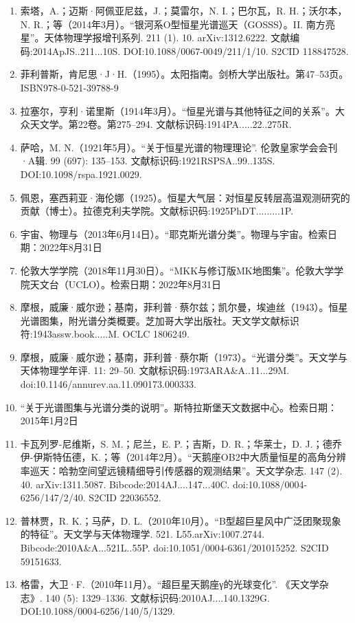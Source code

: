 \begin{enumerate}
\item 索塔，A.；迈斯·阿佩亚尼兹，J.；莫雷尔，N. I.；巴尔瓦，R. H.；沃尔本，N. R.；等（2014年3月）。“银河系O型恒星光谱巡天（GOSSS）。II. 南方亮星”。天体物理学报增刊系列. 211 (1). 10. arXiv:1312.6222. 文献编码:2014ApJS..211...10S. DOI:10.1088/0067-0049/211/1/10. S2CID 118847528.
\item 菲利普斯，肯尼思·J·H.（1995）。太阳指南。剑桥大学出版社。第47–53页。ISBN978-0-521-39788-9
\item 拉塞尔，亨利·诺里斯（1914年3月）。“恒星光谱与其他特征之间的关系”。大众天文学。第22卷。第275–294. 文献标识码:1914PA.....22..275R.
\item 萨哈，M. N.（1921年5月）。“关于恒星光谱的物理理论”. 伦敦皇家学会会刊·A辑. 99 (697): 135–153. 文献标识码:1921RSPSA..99..135S. DOI:10.1098/rspa.1921.0029.
\item 佩恩，塞西莉亚·海伦娜（1925）。恒星大气层：对恒星反转层高温观测研究的贡献（博士）。拉德克利夫学院。文献标识码:1925PhDT.........1P.
\item 宇宙、物理与（2013年6月14日）。“耶克斯光谱分类”。物理与宇宙。检索日期：2022年8月31日
\item 伦敦大学学院（2018年11月30日）。“MKK与修订版MK地图集”。伦敦大学学院天文台（UCLO）。检索日期：2022年8月31日
\item 摩根，威廉·威尔逊；基南，菲利普·蔡尔兹；凯尔曼，埃迪丝（1943）。恒星光谱图集，附光谱分类概要。芝加哥大学出版社。天文学文献标识符:1943assw.book.....M. OCLC 1806249.
\item 摩根，威廉·威尔逊；基南，菲利普·蔡尔斯（1973）。“光谱分类”。天文学与天体物理学年评. 11: 29–50. 文献标识码:1973ARA&A..11...29M. doi:10.1146/annurev.aa.11.090173.000333.
\item “关于光谱图集与光谱分类的说明”。斯特拉斯堡天文数据中心。检索日期：2015年1月2日
\item 卡瓦列罗-尼维斯，S. M.；尼兰，E. P.；吉斯，D. R.；华莱士，D. J.；德乔伊-伊斯特伍德，K.；等（2014年2月）。“天鹅座OB2中大质量恒星的高角分辨率巡天：哈勃空间望远镜精细导引传感器的观测结果”。天文学杂志. 147 (2). 40. arXiv:1311.5087. Bibcode:2014AJ....147...40C. doi:10.1088/0004-6256/147/2/40. S2CID 22036552.
\item 普林贾，R. K.；马萨，D. L.（2010年10月）。“B型超巨星风中广泛团聚现象的特征”。天文学与天体物理学. 521. L55.arXiv:1007.2744. Bibcode:2010A&A...521L..55P. doi:10.1051/0004-6361/201015252. S2CID 59151633.
\item 格雷，大卫·F.（2010年11月）。“超巨星天鹅座γ的光球变化”. 《天文学杂志》. 140 (5): 1329–1336. 文献标识码:2010AJ....140.1329G. DOI:10.1088/0004-6256/140/5/1329.

\end{enumerate}
